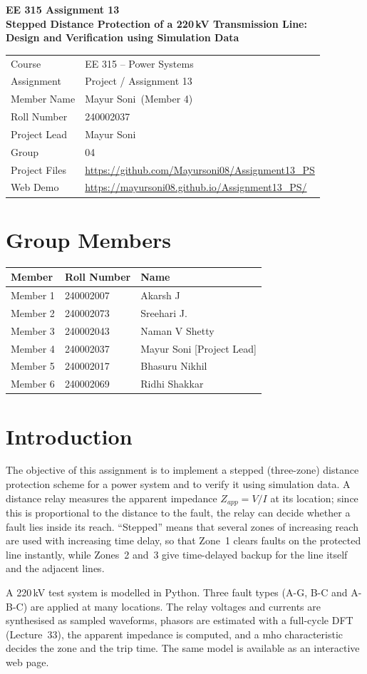 \documentclass[11pt,a4paper]{article}
\newcommand{\MemberName}{Mayur Soni}
\newcommand{\MemberNo}{Member 4}
\newcommand{\RollNo}{240002037}
\newcommand{\GroupNo}{04}
\newcommand{\RepoURL}{https://github.com/Mayursoni08/Assignment13_PS}
\newcommand{\DemoURL}{https://mayursoni08.github.io/Assignment13_PS/}
\newcommand{\GroupTable}{%
Member 1 & 240002007 & Akarsh J\\
Member 2 & 240002073 & Sreehari J.\\
Member 3 & 240002043 & Naman V Shetty\\
Member 4 & 240002037 & Mayur Soni [Project Lead]\\
Member 5 & 240002017 & Bhasuru Nikhil\\
Member 6 & 240002069 & Ridhi Shakkar\\}
\begin{document}
\begin{center}
{\LARGE\bfseries EE 315 Assignment 13}\\[6pt]
{\Large\bfseries Stepped Distance Protection of a 220\,kV Transmission Line:\\ Design and Verification using Simulation Data}\\[10pt]
\begin{tabular}{ll}
Course & EE 315 -- Power Systems\\
Assignment & Project / Assignment 13\\
Member Name & \MemberName\ (\MemberNo)\\
Roll Number & \RollNo\\
Project Lead & Mayur Soni\\
Group & \GroupNo\\
Project Files & \url{\RepoURL}\\
Web Demo & \url{\DemoURL}\\
\end{tabular}
\end{center}

\section{Group Members}
\begin{center}\begin{tabular}{lll}\toprule
Member & Roll Number & Name\\\midrule
\GroupTable
\bottomrule\end{tabular}\end{center}

\section{Introduction}
The objective of this assignment is to implement a stepped (three-zone) distance protection scheme for a power system and to verify it using simulation data. A distance relay measures the apparent impedance $Z_{app}=V/I$ at its location; since this is proportional to the distance to the fault, the relay can decide whether a fault lies inside its reach. ``Stepped'' means that several zones of increasing reach are used with increasing time delay, so that Zone~1 clears faults on the protected line instantly, while Zones~2 and~3 give time-delayed backup for the line itself and the adjacent lines.

A 220\,kV test system is modelled in Python. Three fault types (A-G, B-C and A-B-C) are applied at many locations. The relay voltages and currents are synthesised as sampled waveforms, phasors are estimated with a full-cycle DFT (Lecture~33), the apparent impedance is computed, and a mho characteristic decides the zone and the trip time. The same model is available as an interactive web page.
\end{document}

